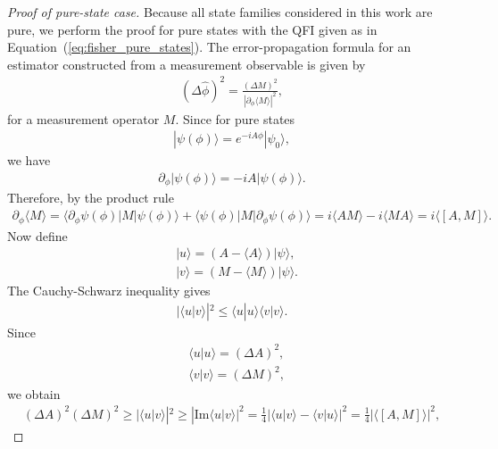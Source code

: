 \begin{proof}[Proof of pure-state case]
Because all state families considered in this work are pure, 
we perform the proof for pure states with the QFI given as in Equation~(\ref{eq:fisher_pure_states}).
The error-propagation formula for an estimator constructed from a measurement observable \cite{tothQuantumMetrologyQuantum2014} is given by
\begin{align}
    (\Delta \hat \phi)^2=\frac{(\Delta M)^2}{\left|\partial_\phi \langle M \rangle \right|^2},
    \label{eq:error_propagation}
\end{align}
for a measurement operator $M$. Since for pure states
\begin{align}
    |\psi(\phi) \rangle =e^{-i A \phi} | \psi_0\rangle,
\end{align}
we have
\begin{align}
    \partial_\phi | \psi(\phi)\rangle = -i A | \psi(\phi)\rangle.
\end{align}
Therefore, by the product rule
\begin{align}
\partial_\phi \langle M \rangle =  \langle \partial_\phi \psi(\phi) | M | \psi(\phi) \rangle + \langle \psi(\phi) | M |\partial_\phi  \psi(\phi) \rangle = i \langle AM\rangle - i \langle M A \rangle = i\langle [A, M] \rangle. \label{eq:partial_phi_exp_M}
\end{align}
Now define
\begin{align}
&|u\rangle = (A-\langle A \rangle) |\psi \rangle,\\
&|v\rangle = (M-\langle M \rangle) |\psi \rangle.
\end{align}
The Cauchy-Schwarz inequality \cite{braunsteinStatisticalDistanceGeometry1994} gives
\begin{align}
    |\langle u | v \rangle |^2 \leq \langle u | u \rangle \langle v | v \rangle.
\end{align}
Since
\begin{align}
    &\langle u | u \rangle = (\Delta A)^2, \\
    &\langle v | v \rangle = (\Delta M)^2,
\end{align}
we obtain
\begin{align}
(\Delta A)^2(\Delta M)^2 \geq |\langle u | v\rangle|^2 \geq |\mathrm{Im} \langle u | v\rangle | ^2 = \frac 1 4 | \langle u | v \rangle - \langle v | u\rangle |^2 = \frac 1 4 |\langle [A, M]\rangle |^2,

\end{align}
\end{proof}
